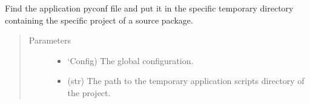 \documentclass[a4paper,10pt,english]{sphinxmanual}
\begin{document}

\begin{fulllineitems}
\label{\detokenize{apidoc_commands/commands:commands.package.find_application_pyconf}}
Find the application pyconf file and put it in the specific temporary 
directory containing the specific project of a source package.
\begin{quote}\begin{description}
\item[{Parameters}] \leavevmode\begin{itemize}
\item {} 
 \textendash{} ‘Config) The global configuration.

\item {} 
 \textendash{} (str) 
The path to the temporary application scripts directory of the project.

\end{itemize}

\end{description}\end{quote}

\end{fulllineitems}

\end{document}
